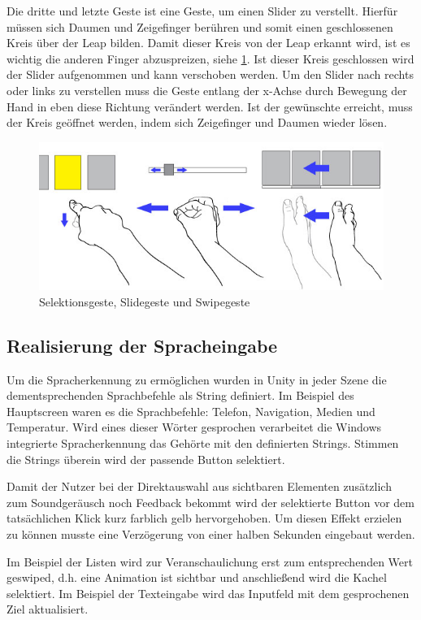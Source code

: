Die dritte und letzte Geste ist eine Geste, um einen Slider zu verstellt. 
Hierfür müssen sich Daumen und Zeigefinger berühren und somit einen geschlossenen Kreis über der Leap bilden. Damit dieser Kreis von der Leap erkannt wird, ist es wichtig die anderen Finger abzuspreizen, siehe \ref{fig:Gestures}. 
Ist dieser Kreis geschlossen wird der Slider aufgenommen und kann verschoben werden. 
Um den Slider nach rechts oder links zu verstellen muss die Geste entlang der x-Achse durch Bewegung der Hand in eben diese Richtung verändert werden. 
Ist der gewünschte  erreicht, muss der Kreis geöffnet werden, indem sich Zeigefinger und Daumen wieder lösen. 
\begin{figure}
	\centering
		\includegraphics[width=1\textwidth]{img/Gestures-mit_Pfeile.jpg}
	\caption{Selektionsgeste, Slidegeste und Swipegeste}
	\label{fig:Gestures}
\end{figure}

\subsection[Sprache]{Realisierung der Spracheingabe} Um die Spracherkennung zu ermöglichen wurden in Unity in jeder Szene die dementsprechenden Sprachbefehle als String definiert. 
Im Beispiel des Hauptscreen waren es die Sprachbefehle: Telefon, Navigation, Medien und Temperatur. 
Wird eines dieser Wörter gesprochen verarbeitet die Windows integrierte Spracherkennung das Gehörte mit den definierten Strings. 
Stimmen die Strings überein wird der passende Button selektiert. 

Damit der Nutzer bei der Direktauswahl aus sichtbaren Elementen zusätzlich zum Soundgeräusch noch Feedback bekommt wird der selektierte Button vor dem tatsächlichen Klick kurz farblich gelb hervorgehoben. 
Um diesen Effekt erzielen zu können musste eine Verzögerung von einer halben Sekunden eingebaut werden.

Im Beispiel der Listen wird zur Veranschaulichung erst zum entsprechenden Wert geswiped, d.h. eine Animation ist sichtbar und anschließend wird die Kachel selektiert. 
Im Beispiel der Texteingabe wird das Inputfeld mit dem gesprochenen Ziel aktualisiert.
